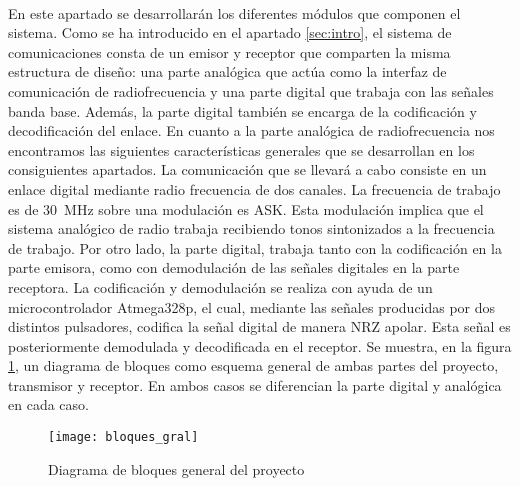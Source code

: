 \paragraph{}
En este apartado se desarrollar\'an los diferentes módulos que componen el sistema.
Como se ha introducido en el apartado \ref{sec:intro}, el sistema de comunicaciones consta de un emisor y receptor que comparten la misma estructura de diseño: 
una parte analógica que actúa como la interfaz de comunicación de radiofrecuencia y una parte digital que trabaja con las señales banda base. Además, la parte digital también se encarga de la codificación y decodificación del enlace.
En cuanto a la parte analógica de radiofrecuencia nos encontramos las siguientes características generales que se desarrollan en los consiguientes apartados. 
La comunicaci\'on que se llevará a cabo consiste en un enlace digital mediante radio frecuencia de dos canales.
La frecuencia de trabajo es de \SI{30}{\mega\hertz} sobre una modulación es ASK.
Esta modulación implica que el sistema analógico de radio trabaja recibiendo tonos sintonizados a la frecuencia de trabajo.
Por otro lado, la parte digital, trabaja tanto con
la codificación en la parte emisora, como con demodulación de las señales digitales en la parte receptora. 
La codificación y demodulación se realiza con ayuda de un microcontrolador Atmega328p, el cual, mediante las señales producidas por dos distintos pulsadores, codifica la señal digital de manera NRZ apolar.
Esta señal es posteriormente demodulada y decodificada en el receptor.
Se muestra, en la figura \ref{fig:bloques_gral}, un diagrama de bloques como esquema general de ambas partes del proyecto, transmisor y receptor. En ambos casos se diferencian la parte digital y anal\'ogica en cada caso.

\begin{figure}[h]
    \centering
    \texttt{[image: bloques\_gral]}
    \caption{Diagrama de bloques general del proyecto}
    \label{fig:bloques_gral}
\end{figure}
